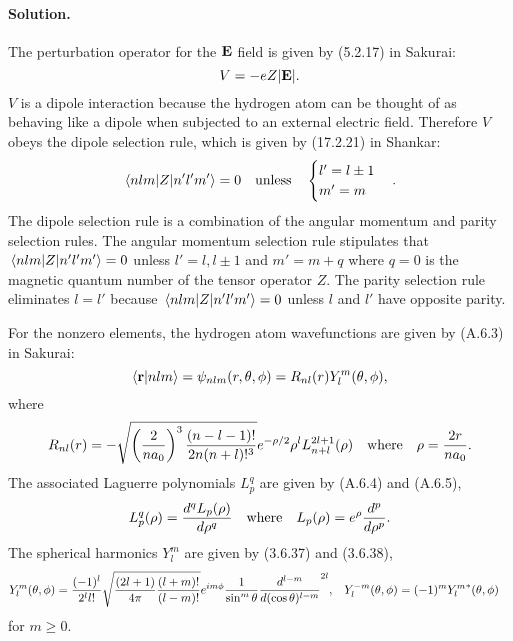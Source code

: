 \documentclass[11pt]{article}
\newcommand{\beq}{\begin{equation*}}
\newcommand{\eeq}{\end{equation*}}
\newcommand{\beqn}{\begin{equation}}
\newcommand{\eeqn}{\end{equation}}
\newenvironment{solution}
{
    \paragraph{Solution.}
    \ignorespaces
}
{
}
\begin{document}
\begin{solution}
	The perturbation operator for the $\mathbf{E}$ field is given by (5.2.17) in Sakurai:
	\beq
		V = -e Z |\vE|.
	\eeq
	$V$ is a dipole interaction because the hydrogen atom can be thought of as behaving like a dipole when subjected to an external electric field.  Therefore $V$ obeys the dipole selection rule, which is given by (17.2.21) in Shankar:
	\beq
		\mel{n l m}{Z}{n' l' m'} = 0 \qq{unless} \begin{cases} l' = l \pm 1 \\ m' = m \end{cases}.
	\eeq
	The dipole selection rule is a combination of the angular momentum and parity selection rules.  The angular momentum selection rule stipulates that $\mel{n l m}{Z}{n' l' m'} = 0$ unless $l' = l, l \pm 1$ and $m' = m + q$ where $q = 0$ is the magnetic quantum number of the tensor operator $Z$.  The parity selection rule eliminates $l = l'$ because $\mel{n l m}{Z}{n' l' m'} = 0$ unless $l$ and $l'$ have opposite parity.
	
	For the nonzero elements, the hydrogen atom wavefunctions are given by (A.6.3) in Sakurai:
	\beq
		\braket{\vr}{n l m} = \psi_{n l m}(r, \tht, \phi) = R_{n l}(r) Y_l^m(\tht, \phi),
	\eeq
	where
	\beqn \label{R}
		R_{n l}(r) = -\sqrt{\left( \frac{2}{n \ao} \right)^3 \frac{(n - l - 1)!}{2n (n + l)!^3}} e^{-\rho / 2} \rho^l L_{n + l}^{2l + 1}(\rho)
		\qq{where}
		\rho = \frac{2 r}{n \ao}.
	\eeqn
	The associated Laguerre polynomials $L_p^q$ are given by (A.6.4) and (A.6.5),
	\beqn \label{laguerre}
		L_p^q(\rho) = \dv[q]{L_p(\rho)}{\rho}
		\qq{where}
		L_p(\rho) = e^\rho \dv[p]{}{\rho} (\rho^p e^{-\rho}).
	\eeqn
	The spherical harmonics $Y_l^m$ are given by (3.6.37) and (3.6.38),
	\begin{align} \label{harm}
		Y_l^m(\theta, \phi) &= \frac{(-1)^l}{2^l l!} \sqrt{\frac{(2l + 1)}{4\pi} \frac{(l + m)!}{(l - m)!}} e^{i m \phi} \frac{1}{\sin^m{\theta}} \dv[{l - m}]{}{(\cos\theta)} (\sin\theta)^{2l}, &
		Y_l^{-m}(\theta, \phi) &= (-1)^m {Y_l^m}^*(\theta, \phi)
	\end{align}
	for $m \geq 0$.
	

\end{solution}
\end{document}
